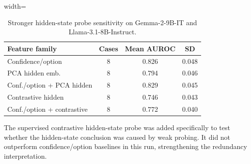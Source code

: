 \begin{table}[t]
\centering
\small
\caption{Stronger hidden-state probe sensitivity on Gemma-2-9B-IT and Llama-3.1-8B-Instruct.}
\label{tab:contrastive}
\begin{threeparttable}
\begin{adjustbox}{width=\textwidth}
\begin{tabular}{lccc}
\toprule
Feature family & Cases & Mean AUROC & SD \\
\midrule
Confidence/option & 8 & 0.826 & 0.048 \\
PCA hidden emb. & 8 & 0.794 & 0.046 \\
Conf./option + PCA hidden & 8 & 0.829 & 0.045 \\
Contrastive hidden & 8 & 0.746 & 0.043 \\
Conf./option + contrastive & 8 & 0.772 & 0.040 \\
\bottomrule
\end{tabular}
\end{adjustbox}

\begin{tablenotes}[flushleft]\footnotesize\item \parbox{0.95\textwidth}{The supervised contrastive hidden-state probe was added specifically to test whether the hidden-state conclusion was caused by weak probing. It did not outperform confidence/option baselines in this run, strengthening the redundancy interpretation.}\end{tablenotes}
\end{threeparttable}
\end{table}

